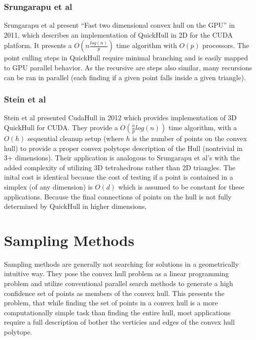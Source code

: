 \documentclass[10pt,a4paper]{report}
\begin{document}
\subsubsection{Srungarapu et al}

Srungarapu et al present ``Fast two dimensional convex hull on the GPU''\cite{SrikanthFast} in 2011, which describes an implementation of QuickHull in 2D for the CUDA platform.
It presents a $O(n\frac{log(n)}{p})$ time algorithm with $O(p)$ processors.
The point culling steps in QuickHull require minimal branching and is easily mapped to GPU parallel behavior. As the recursive are steps also similar, many recursions can be ran in parallel (each finding if a given point falls inside a given triangle).


\subsubsection{Stein et al}

Stein et al presented CudaHull\cite{Stein2012CudaHull} in 2012 which provides implementation of 3D QuickHull for CUDA. They provide a $O(\frac{n}{p}log(n))$ time algorithm, with a $O(h)$ sequential cleanup setup (where $h$ is the number of points on the convex hull) to provide a proper convex polytope description of the Hull (nontrivial in 3+ dimensions).
Their application is analogous to Srungarapu et al's\cite{SrikanthFast} with the added complexity of utilizing 3D tetrahedrons rather than 2D triangles. The inital cost is identical because the cost of testing if a point is contained in a simplex (of any dimension) is $O(d)$ which is assumed to be constant for these applications.
Because the final connections of points on the hull is not fully determined by QuickHull in higher dimensions, 



\section{Sampling Methods}


Sampling methods are generally not searching for solutions in a geometrically intuitive way.
They pose the convex hull problem as a linear programming problem and utilize conventional parallel search methods to generate a high confidence set of points as members of the convex hull.
This presents the problem, that while finding the set of points in a convex hull is a more computationally simple task than finding the entire hull, most applications require a full description of bother the verticies and edges of the convex hull polytope.
\end{document}
